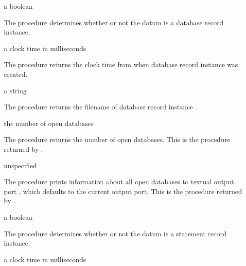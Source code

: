 \begin{procedure}
\end{procedure}
\returns{} a boolean

The  procedure determines whether or not the datum
 is a database record instance.

\begin{procedure}
\end{procedure}
\returns{} a clock time in milliseconds

The  procedure returns the clock time from
 when database record instance  was created.

\begin{procedure}
\end{procedure}
\returns{} a string

The  procedure returns the filename of
database record instance .

\begin{procedure}
\end{procedure}
\returns{} the number of open databases

The  procedure returns the number of open
databases.
This is the procedure returned by .

\begin{procedure}
\end{procedure}
\returns{} unspecified

The  procedure prints information about all open
databases to textual output port , which defaults to the
current output port.
This is the procedure returned by .

\begin{procedure}
\end{procedure}
\returns{} a boolean

The  procedure determines whether or not the datum
 is a statement record instance.

\begin{procedure}
\end{procedure}
\returns{} a clock time in milliseconds

